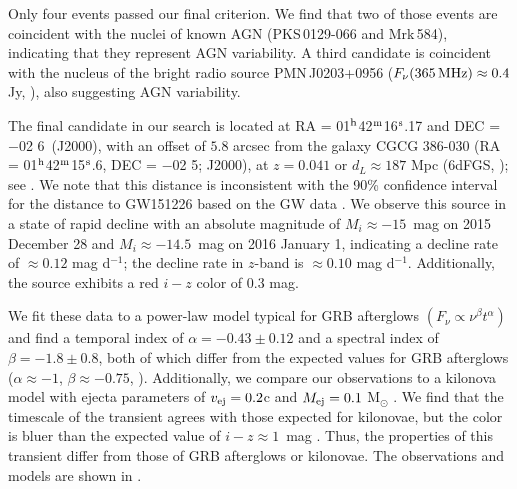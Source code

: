 \clearpage
Only four events passed our final criterion. We find that two of those events are  coincident with the nuclei of known AGN (PKS\,0129-066 and Mrk\,584), indicating  that they represent AGN variability. A third candidate is coincident with the nucleus of the bright radio source PMN\,J0203+0956 ($F_\nu(365\,{\rm MHz})\approx 0.4$ Jy,  \citealt{Douglas+96}), also suggesting AGN variability.

The final candidate in our search is located at RA = 01$^{\rm h}$42$^{\rm m}$16$^{\rm s}$.17  and DEC = $-$02 6\arcsec~(J2000), with an offset of $5.8$ arcsec from the galaxy  CGCG 386-030 (RA =  01$^{\rm h}$42$^{\rm m}$15$^{\rm s}$.6, DEC = $-$02  5\arcsec; J2000), at $z = 0.041$ or $d_L \approx 187$ Mpc (6dFGS, \citealt{Jones+04,Jones+09}); see  . We note that this distance is inconsistent with the 90\% confidence interval for the distance to GW151226 based on the GW data \citep{LIGOGW151226}. We observe this source in a state of rapid decline with an  absolute magnitude of $M_i \approx -15$~mag on 2015 December 28 and $M_i\approx -14.5$~mag on 2016  January 1, indicating a decline rate of $\approx 0.12$ mag d$^{-1}$; the decline rate in $z$-band is  $\approx 0.10$ mag d$^{-1}$. Additionally, the source exhibits a red $i-z$ color of $0.3$ mag.

We fit these data to a power-law model typical for GRB afterglows $(F_\nu \propto \nu^{\beta} t^{\alpha})$  and find a temporal index of $\alpha = -0.43\pm0.12$ and a spectral index of $\beta = -1.8\pm0.8$,  both of which differ from the expected values for GRB afterglows ($\alpha \approx -1$,  $\beta \approx -0.75$, \citealt{Sari+98}). Additionally, we compare our observations to a  kilonova model with ejecta parameters of $v_{\rm ej} = 0.2$c and $M_{\rm ej} = 0.1$ M$_\odot$ \citep{BarnesKasen13}. We find that the timescale of the transient agrees with those expected for kilonovae,  but the color is bluer than the expected value of $i-z \approx 1$~mag \citep{BarnesKasen13}. Thus, the properties of this transient differ from those of GRB afterglows or kilonovae. The observations  and models are shown in .

